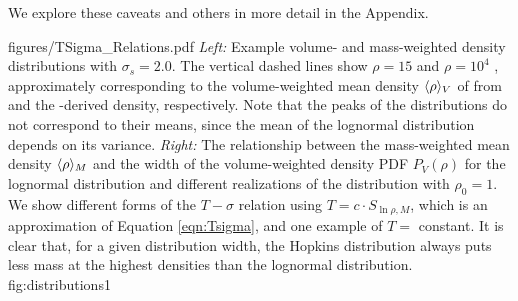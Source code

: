 We explore these caveats and others in more detail in the Appendix.

{figures/TSigma_Relations.pdf}
{ %
\textit{Left:} Example volume- and mass-weighted density distributions with
$\sigma_s=2.0$.  The vertical dashed lines show $\rho = 15$ \percc and $\rho=10^4$ \percc,
approximately corresponding to the volume-weighted mean density $\langle\rho\rangle_V$ of \GRSMC from \thirteenco
and the \formaldehyde-derived density, respectively.  Note that the peaks of the distributions do not correspond to their
means, since the mean of the lognormal distribution depends on its variance.
\textit{Right:} The relationship between the mass-weighted mean density
$\langle\rho\rangle_M$ and the width of the volume-weighted density PDF $P_V(\rho)$ for the
lognormal distribution and different realizations of the \citet{Hopkins2013a}
distribution with $\rho_0=1$.  We show different forms of the $T-\sigma$
relation using $T=c \cdot S_{\ln \rho,M}$, which is an approximation of
Equation \ref{eqn:Tsigma}, and one example of $T=$ constant.  It is clear that, for a
given distribution width, the Hopkins distribution always puts less mass at the
highest densities than the lognormal
distribution.}
{fig:distributions}{1}%

% 

% 

